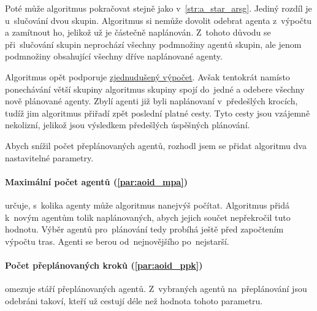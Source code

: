 Poté může algoritmus pokračovat stejně jako v~\ref{str:a_star_arsg}.
Jediný rozdíl je u~slučování dvou skupin.
Algoritmus si nemůže dovolit odebrat agenta z~výpočtu a zamítnout ho, jelikož už je částečně naplánován.
Z~tohoto důvodu se při~slučování skupin neprochází všechny podmnožiny agentů skupin,
ale jenom podmnožiny obsahující všechny dříve naplánované agenty.

Algoritmus opět podporuje \hyperref[par:arsg_zvp]{zjednudušený výpočet}.
Avšak tentokrát namísto ponechávání větší skupiny
algoritmus skupiny spojí do~jedné a odebere všechny nově plánované agenty.
Zbylí agenti již byli naplánovaní v~předešlých krocích, tudíž jim algoritmus přiřadí zpět poslední platné cesty.
Tyto cesty jsou vzájemně nekolizní, jelikož jsou výsledkem předešlých úspěšných plánování.

Abych snížil počet přeplánovaných agentů, rozhodl jsem se přidat algoritmu dva nastavitelné parametry.

\paragraph{Maximální počet agentů (\ref{par:aoid_mpa})} určuje,
s~kolika agenty může algoritmus nanejvýš počítat.
Algoritmus přidá k~novým agentům tolik naplánovaných, abych jejich součet nepřekročil tuto hodnotu.
Výběr agentů pro~plánování tedy probíhá ještě před započtením výpočtu tras.
Agenti se berou od~nejnovějšího po~nejstarší.

\paragraph{Počet přeplánovaných kroků (\ref{par:aoid_ppk})}
omezuje stáří přeplánovaných agentů.
Z~vybraných agentů na~přeplánování jsou odebráni takoví, kteří už cestují déle než hodnota tohoto parametru.
